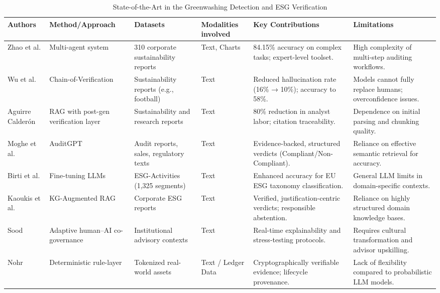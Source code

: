 \begin{landscape}
\begin{table}[p]
\centering
\caption{State-of-the-Art in the Greenwashing Detection and ESG Verification}
\label{tab:greenwashing-detection-esg-verification}
\small
\renewcommand{\arraystretch}{1.2}
\begin{tabularx}{\linewidth}{|p{1.8cm}|X|X|p{1.8cm}|X|X|}
\hline
Authors & Method/Approach & Datasets & Modalities involved & Key Contributions & Limitations \\ \hline
Zhao et al.  \parencite{yilei_zhao_b7bbd9c8} & Multi-agent system & 310 corporate sustainability reports & Text, Charts & 84.15\% accuracy on complex tasks; expert-level toolset. & High complexity of multi-step auditing workflows. \\ \hline
Wu et al.  \parencite{yue_wu_cae353aa} & Chain-of-Verification & Sustainability reports (e.g., football) & Text & Reduced hallucination rate (16\% → 10\%); accuracy to 58\%. & Models cannot fully replace humans; overconfidence issues. \\ \hline
Aguirre Calderón  \parencite{juan_aguirre_calder_n_5eae82e0} & RAG with post-gen verification layer & Sustainability and research reports & Text & 80\% reduction in analyst labor; citation traceability. & Dependence on initial parsing and chunking quality. \\ \hline
Moghe et al.  \parencite{abhijeet_b__moghe_963e6c96} & AuditGPT & Audit reports, sales, regulatory texts & Text & Evidence-backed, structured verdicts (Compliant/Non-Compliant). & Reliance on effective semantic retrieval for accuracy. \\ \hline
Birti et al.  \parencite{mattia_birti_c097e3e8} & Fine-tuning LLMs & ESG-Activities (1,325 segments) & Text & Enhanced accuracy for EU ESG taxonomy classification. & General LLM limits in domain-specific contexts. \\ \hline
Kaoukis et al.  \parencite{kaoukis__georgios_35bab107} & KG-Augmented RAG & Corporate ESG reports & Text & Verified, justification-centric verdicts; responsible abstention. & Reliance on highly structured domain knowledge bases. \\ \hline
Sood  \parencite{rohit_sood_cb3a4ead} & Adaptive human–AI co-governance & Institutional advisory contexts & Text & Real-time explainability and stress-testing protocols. & Requires cultural transformation and advisor upskilling. \\ \hline
Nohr  \parencite{steven_paul_nohr_a6874924} & Deterministic rule-layer & Tokenized real-world assets & Text / Ledger Data & Cryptographically verifiable evidence; lifecycle provenance. & Lack of flexibility compared to probabilistic LLM models. \\ \hline

\end{tabularx}
\end{table}
\end{landscape}
